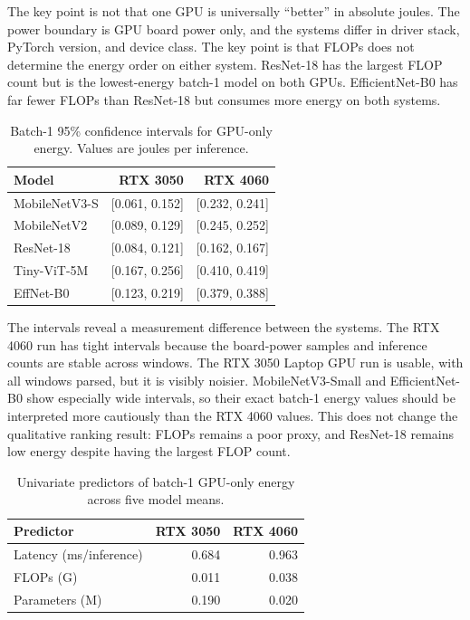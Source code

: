 \documentclass[conference]{IEEEtran}
\begin{document}
The key point is not that one GPU is universally ``better'' in absolute
joules. The power boundary is GPU board power only, and the systems differ in
driver stack, PyTorch version, and device class. The key point is that FLOPs
does not determine the energy order on either system. ResNet-18 has the
largest FLOP count but is the lowest-energy batch-1 model on both GPUs.
EfficientNet-B0 has far fewer FLOPs than ResNet-18 but consumes more energy on
both systems.

\begin{table}[t]
\centering
\caption{Batch-1 95\% confidence intervals for GPU-only energy. Values are
joules per inference.}
\label{tab:ci}
\scriptsize
\begin{tabular}{@{}lrr@{}}
\toprule
Model & RTX 3050 & RTX 4060\\
\midrule
MobileNetV3-S & [0.061, 0.152] & [0.232, 0.241]\\
MobileNetV2 & [0.089, 0.129] & [0.245, 0.252]\\
ResNet-18 & [0.084, 0.121] & [0.162, 0.167]\\
Tiny-ViT-5M & [0.167, 0.256] & [0.410, 0.419]\\
EffNet-B0 & [0.123, 0.219] & [0.379, 0.388]\\
\bottomrule
\end{tabular}
\end{table}

The intervals reveal a measurement difference between the systems. The RTX
4060 run has tight intervals because the board-power samples and inference
counts are stable across windows. The RTX 3050 Laptop GPU run is usable, with
all windows parsed, but it is visibly noisier. MobileNetV3-Small and
EfficientNet-B0 show especially wide intervals, so their exact batch-1 energy
values should be interpreted more cautiously than the RTX 4060 values. This
does not change the qualitative ranking result: FLOPs remains a poor proxy,
and ResNet-18 remains low energy despite having the largest FLOP count.

\begin{table}[t]
\centering
\caption{Univariate predictors of batch-1 GPU-only energy across five model
means.}
\label{tab:predictors}
\small
\begin{tabular}{lrr}
\toprule
Predictor & RTX 3050 & RTX 4060\\
\midrule
Latency (ms/inference) & 0.684 & 0.963\\
FLOPs (G) & 0.011 & 0.038\\
Parameters (M) & 0.190 & 0.020\\
\bottomrule
\end{tabular}
\end{table}
\end{document}
